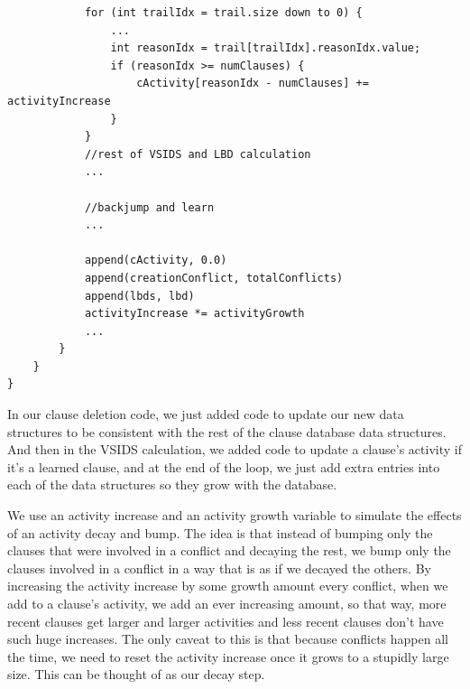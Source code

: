 \documentclass[oneside]{book}
\begin{document}
\begin{lstlisting}
            for (int trailIdx = trail.size down to 0) {
                ...
                int reasonIdx = trail[trailIdx].reasonIdx.value;
                if (reasonIdx >= numClauses) {
                    cActivity[reasonIdx - numClauses] += activityIncrease
                }
            }
            //rest of VSIDS and LBD calculation
            ...

            //backjump and learn 
            ... 

            append(cActivity, 0.0)
            append(creationConflict, totalConflicts)
            append(lbds, lbd)
            activityIncrease *= activityGrowth
            ...
        }
    }
}
\end{lstlisting}
\noindent
In our clause deletion code, we just added code to update our new data structures
to be consistent with the rest of the clause database data structures. And then 
in the VSIDS calculation, we added code to update a clause's activity if it's 
a learned clause, and at the end of the loop, we just add extra entries into each 
of the data structures so they grow with the database. 

We use an activity increase and an activity growth variable to simulate the effects 
of an activity decay and bump. The idea is that instead of bumping only the clauses 
that were involved in a conflict and decaying the rest, we bump only the clauses 
involved in a conflict in a way that is as if we decayed the others. By increasing 
the activity increase by some growth amount every conflict, when we add to a clause's 
activity, we add an ever increasing amount, so that way, more recent clauses get 
larger and larger activities and less recent clauses don't have such huge increases. 
The only caveat to this is that because conflicts happen all the time, we need to 
reset the activity increase once it grows to a stupidly large size. This can be thought 
of as our decay step.
\end{document}
